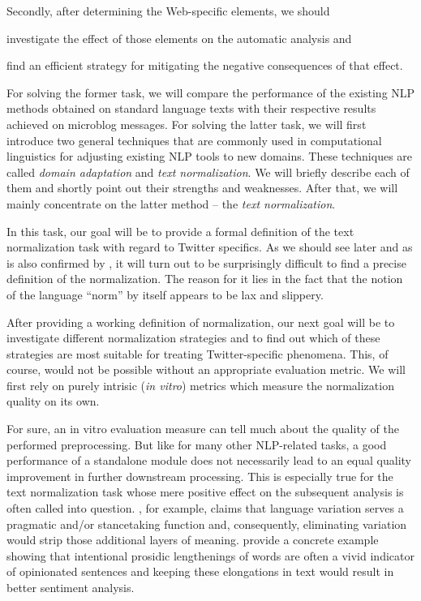 Secondly, after determining the Web-specific elements, we should
\begin{inparaenum}
\item investigate the effect of those elements on the automatic analysis and
\item find an efficient strategy for mitigating the negative consequences of
  that effect.
\end{inparaenum}
For solving the former task, we will compare the performance of the existing
NLP methods obtained on standard language texts with their respective results
achieved on microblog messages.  For solving the latter task, we will first
introduce two general techniques that are commonly used in computational
linguistics for adjusting existing NLP tools to new domains.  These techniques
are called \emph{domain adaptation} and \emph{text normalization}.  We will
briefly describe each of them and shortly point out their strengths and
weaknesses.  After that, we will mainly concentrate on the latter method --
the \emph{text normalization}.

In this task, our goal will be to provide a formal definition of the text
normalization task with regard to Twitter specifics.  As we should see later
and as is also confirmed by \citet{Eisenstein:13}, it will turn out to be
surprisingly difficult to find a precise definition of the normalization.  The
reason for it lies in the fact that the notion of the language ``norm'' by
itself appears to be lax and slippery.

After providing a working definition of normalization, our next goal will be
to investigate different normalization strategies and to find out which of
these strategies are most suitable for treating Twitter-specific phenomena.
This, of course, would not be possible without an appropriate evaluation
metric.  %
We will first rely on purely intrisic (\emph{in vitro}) metrics which measure
the normalization quality on its own.

For sure, an in vitro evaluation measure can tell much about the quality of
the performed preprocessing.  But like for many other NLP-related tasks, a
good performance of a standalone module does not necessarily lead to an equal
quality improvement in further downstream processing.  This is especially true
for the text normalization task whose mere positive effect on the subsequent
analysis is often called into question.  \citet{DuBois:07}, for example,
claims that language variation serves a pragmatic and/or stancetaking function
and, consequently, eliminating variation would strip those additional layers
of meaning.  \citet{BrodyDiakopoulos:11} provide a concrete example showing
that intentional prosidic lengthenings of words are often a vivid indicator of
opinionated sentences and keeping these elongations in text would result in
better sentiment analysis.

